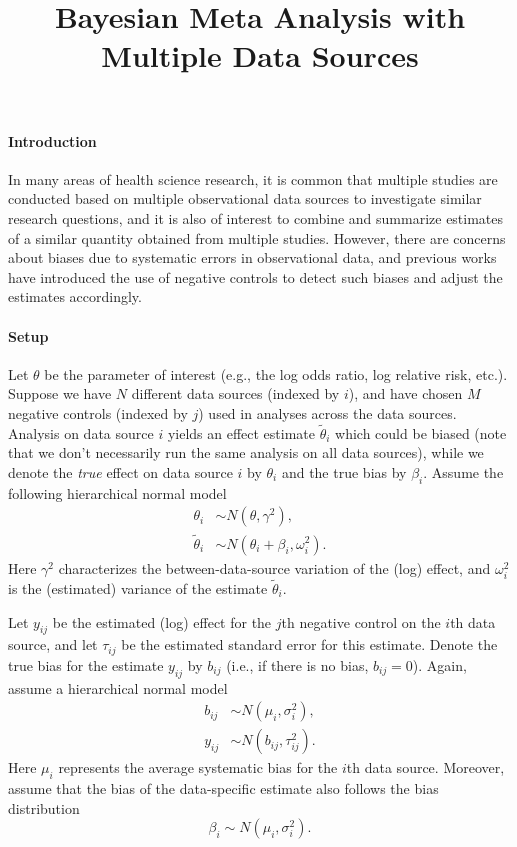 \documentclass{article}
\title{Bayesian Meta Analysis with Multiple Data Sources}
\author{}
\date{}
\begin{document}
\maketitle


\paragraph{Introduction} In many areas of health science research, it is common that multiple studies are conducted based on multiple observational data sources to investigate similar research questions, and it is also of interest to combine and summarize estimates of a similar quantity obtained from multiple studies. However, there are concerns about biases due to systematic errors in observational data, and previous works have introduced the use of negative controls to detect such biases and adjust the estimates accordingly. 

\paragraph{Setup}
Let $\theta$ be the parameter of interest (e.g., the log odds ratio, log relative risk, etc.). Suppose we have $N$ different data sources (indexed by $i$), and have chosen $M$ negative controls (indexed by $j$) used in analyses across the data sources. Analysis on data source $i$ yields an effect estimate $\tilde{\theta}_i$ which could be biased (note that we don't necessarily run the same analysis on all data sources), while we denote the \emph{true} effect on data source $i$ by $\theta_i$ and the true bias by $\beta_i$. Assume the following hierarchical normal model
\begin{align}
    \theta_i &\sim N(\theta, \gamma^2),\\
    \tilde\theta_i &\sim N(\theta_i + \beta_i, \omega_i^2).
\end{align}
Here $\gamma^2$ characterizes the between-data-source variation of the (log) effect, and $\omega_i^2$ is the (estimated) variance of the estimate $\tilde\theta_i$. 

Let $y_{ij}$ be the estimated (log) effect for the $j$th negative control on the $i$th data source, and let $\tau_{ij}$ be the estimated standard error for this estimate. Denote the true bias for the estimate $y_{ij}$ by $b_{ij}$ (i.e., if there is no bias, $b_{ij} = 0$). Again, assume a hierarchical normal model
\begin{align}
    b_{ij} &\sim N(\mu_i, \sigma_i^2),\\
    y_{ij} &\sim N(b_{ij}, \tau_{ij}^2).
\end{align}
Here $\mu_i$ represents the average systematic bias for the $i$th data source. Moreover, assume that the bias of the data-specific estimate also follows the bias distribution
\begin{equation}
    \beta_i \sim N(\mu_i, \sigma_i^2).
\end{equation}
\end{document}
